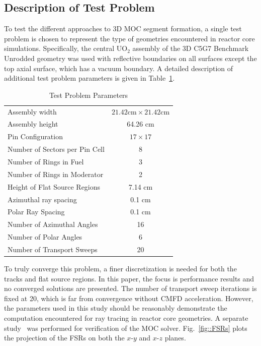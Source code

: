 \subsection{Description of Test Problem}
To test the different approaches to 3D MOC segment formation, a single test problem is chosen to represent the type of geometries encountered in reactor core simulations. Specifically, the central UO$_{\text{2}}$ assembly of the 3D C5G7 Benchmark Unrodded geometry was used with reflective boundaries on all surfaces except the top axial surface, which has a vacuum boundary. A detailed description of additional test problem parameters is given in Table~\ref{tab::problem}.

\begin{table}[ht]
	\centering
	\caption{Test Problem Parameters}
	\medskip
	\begin{tabular}{|l|c|}
		\hline
		Assembly width &  $21.42 \text{cm} \times 21.42 \text{cm}$\\
		Assembly height & 64.26 cm\\
		Pin Configuration &  $17\times 17$\\
		Number of Sectors per Pin Cell & 8 \\
		Number of Rings in Fuel &  3 \\
		Number of Rings in Moderator & 2 \\
		Height of Flat Source Regions & 7.14 cm \\
		Azimuthal ray spacing & 0.1 cm \\
		Polar Ray Spacing & 0.1 cm \\
		Number of Azimuthal Angles & 16 \\
		Number of Polar Angles & 6 \\
		Number of Transport Sweeps & 20 \\
		\hline
	\end{tabular}
	\label{tab::problem}
\end{table}

To truly converge this problem, a finer discretization is needed for both the tracks and flat source regions. In this paper, the focus is performance results and no converged solutions are presented. The number of transport sweep iterations is fixed at 20, which is far from convergence without CMFD acceleration. However, the parameters used in this study should be reasonably demonstrate the computation encountered for ray tracing in reactor core geometries. A separate study~\cite{sam_new} was performed for verification of the MOC solver. Fig.~\ref{fig::FSRs} plots the projection of the FSRs on both the $x$-$y$ and $x$-$z$ planes.


